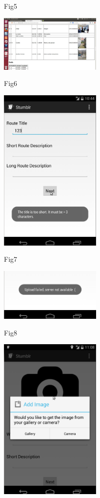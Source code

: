 \documentclass{article}
\begin{document}
	Fig5
	
	\includegraphics[width=5cm]{10}
	
	Fig6
	
	\includegraphics[width=5cm]{20}
	
	Fig7
	
	\includegraphics[width=5cm]{21}
	
	Fig8
	
	\includegraphics[width=5cm]{25}
	
\end{document}
